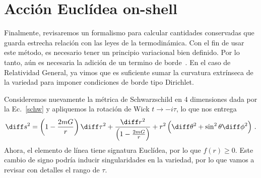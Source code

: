 \documentclass[../Main.tex]{subfiles}
\begin{document}
\section{Acción Euclídea on-shell \label{sec:AEO}}
Finalmente, revisaremos un formalismo para calcular cantidades conservadas que guarda estrecha relación con las leyes de la termodinámica. Con el fin de usar este método, es necesario tener un principio variacional bien definido. Por lo tanto, aún es necesaria la adición de un termino de borde~\cite{Gibbons:1976ue}. En el caso de Relatividad General, ya vimos que es suficiente sumar la curvatura extrínseca de la variedad para imponer condiciones de borde tipo Dirichlet. 

Consideremos nuevamente la métrica de Schwarzschild en 4 dimensiones dada por la Ec.~\eqref{schw} y apliquemos la rotación de Wick $t\to -i\tau$, lo que nos entrega
\begin{align}
 \diff s^2=\left(1-\frac{2mG}{r}\right)\diff \tau^2+\frac{\diff r^2}{\left(1-\frac{2mG}{r}\right)}+r^2\left(\diff \theta^2+\sin^2\theta\diff \phi^2\right) \, . \label{euclids}
\end{align}
Ahora, el elemento de línea tiene signatura Euclídea, por lo que $f(r)\geq 0$. Este cambio de signo podría inducir singularidades en la variedad, por lo que vamos a revisar con detalles el rango de $\tau$. 
\end{document}
